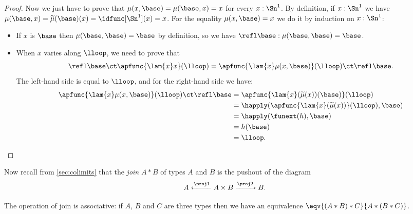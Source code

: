 {\begin{proof}
  Now we just have to prove that $\mu(x,\base)=\mu(\base,x)=x$ for every
  $x:\Sn^1$.
  By definition, if $x:\Sn^1$ we have
  $\mu(\base,x)=\widetilde\mu(\base)(x)=\idfunc[\Sn^1](x)=x$. For the equality
  $\mu(x,\base)=x$ we do it by induction on $x:\Sn^1$:
  \begin{itemize}
  \item If $x$ is $\base$ then $\mu(\base,\base)=\base$ by definition, so we
    have $\refl\base:\mu(\base,\base)=\base$.
  \item When $x$ varies along $\lloop$, we need to prove that
    \[\refl\base\ct\apfunc{\lam{x}x}({\lloop})=
    \apfunc{\lam{x}\mu(x,\base)}({\lloop})\ct\refl\base.\]
    The left-hand side is equal to $\lloop$, and for the right-hand side we have:
    \begin{align*}
      \apfunc{\lam{x}\mu(x,\base)}({\lloop})\ct\refl\base &=
      \apfunc{\lam{x}(\widetilde\mu(x))(\base)}({\lloop})\\
      &=\happly(\apfunc{\lam{x}(\widetilde\mu(x))}({\lloop}),\base)\\
      &=\happly(\funext(h),\base)\\
      &=h(\base)\\
      &=\lloop. \qedhere
    \end{align*}
  \end{itemize}
\end{proof}

Now recall from \cref{sec:colimits} that the \emph{join} $A*B$ of types $A$ and $B$ is the pushout of the diagram
%
\[A \xleftarrow{\proj1}A\times B \xrightarrow{\proj2} B. \]

\begin{lem}
  The operation of join is associative: if $A$, $B$ and $C$ are three types
  then we have an equivalence $\eqv{(A*B)*C}{A*(B*C)}$.
\end{lem}

}
